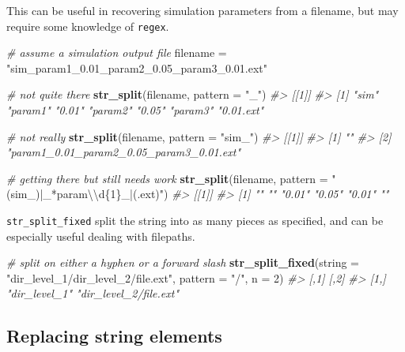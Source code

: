 \documentclass[]{book}
\newenvironment{Shaded}{}{}
\newcommand{\CharTok}[1]{\textcolor[rgb]{0.25,0.44,0.63}{#1}}
\newcommand{\CommentTok}[1]{\textcolor[rgb]{0.38,0.63,0.69}{\textit{#1}}}
\newcommand{\DataTypeTok}[1]{\textcolor[rgb]{0.56,0.13,0.00}{#1}}
\newcommand{\DecValTok}[1]{\textcolor[rgb]{0.25,0.63,0.44}{#1}}
\newcommand{\KeywordTok}[1]{\textcolor[rgb]{0.00,0.44,0.13}{\textbf{#1}}}
\newcommand{\NormalTok}[1]{#1}
\newcommand{\StringTok}[1]{\textcolor[rgb]{0.25,0.44,0.63}{#1}}
\begin{document}
This can be useful in recovering simulation parameters from a filename, but may require some knowledge of \texttt{regex}.

\begin{Shaded}
\begin{Highlighting}[]
\CommentTok{# assume a simulation output file}
\NormalTok{filename =}\StringTok{ "sim_param1_0.01_param2_0.05_param3_0.01.ext"}

\CommentTok{# not quite there}
\KeywordTok{str_split}\NormalTok{(filename, }\DataTypeTok{pattern =} \StringTok{"_"}\NormalTok{)}
\CommentTok{#> [[1]]}
\CommentTok{#> [1] "sim"      "param1"   "0.01"     "param2"   "0.05"     "param3"   "0.01.ext"}

\CommentTok{# not really}
\KeywordTok{str_split}\NormalTok{(filename,}
          \DataTypeTok{pattern =} \StringTok{"sim_"}\NormalTok{)}
\CommentTok{#> [[1]]}
\CommentTok{#> [1] ""                                       }
\CommentTok{#> [2] "param1_0.01_param2_0.05_param3_0.01.ext"}

\CommentTok{# getting there but still needs work}
\KeywordTok{str_split}\NormalTok{(filename,}
          \DataTypeTok{pattern =} \StringTok{"(sim_)|_*param}\CharTok{\textbackslash{}\textbackslash{}}\StringTok{d\{1\}_|(.ext)"}\NormalTok{)}
\CommentTok{#> [[1]]}
\CommentTok{#> [1] ""     ""     "0.01" "0.05" "0.01" ""}
\end{Highlighting}
\end{Shaded}

\texttt{str\_split\_fixed} split the string into as many pieces as specified, and can be especially useful dealing with filepaths.

\begin{Shaded}
\begin{Highlighting}[]
\CommentTok{# split on either a hyphen or a forward slash}
\KeywordTok{str_split_fixed}\NormalTok{(}\DataTypeTok{string =} \StringTok{"dir_level_1/dir_level_2/file.ext"}\NormalTok{,}
                \DataTypeTok{pattern =} \StringTok{"/"}\NormalTok{,}
                \DataTypeTok{n =} \DecValTok{2}\NormalTok{)}
\CommentTok{#>      [,1]          [,2]                  }
\CommentTok{#> [1,] "dir_level_1" "dir_level_2/file.ext"}
\end{Highlighting}
\end{Shaded}

\hypertarget{replacing-string-elements}{%
\subsection{Replacing string elements}\label{replacing-string-elements}}
\end{document}
